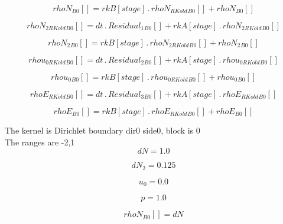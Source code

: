 \documentclass{article}
\begin{document}
\begin{dmath}{rhoN{_{B0}}}[{}] = {rkB}[{stage}] \,.\, {rhoN_{RKold}{_{B0}}}[{}] + {rhoN{_{B0}}}[{}]\end{dmath}

\begin{dmath}{rhoN_{2 RKold}{_{B0}}}[{}] = dt \,.\, {Residual_{1}{_{B0}}}[{}] + {rkA}[{stage}] \,.\, {rhoN_{2 RKold}{_{B0}}}[{}]\end{dmath}

\begin{dmath}{rhoN_{2}{_{B0}}}[{}] = {rkB}[{stage}] \,.\, {rhoN_{2 RKold}{_{B0}}}[{}] + {rhoN_{2}{_{B0}}}[{}]\end{dmath}

\begin{dmath}{rhou_{0 RKold}{_{B0}}}[{}] = dt \,.\, {Residual_{2}{_{B0}}}[{}] + {rkA}[{stage}] \,.\, {rhou_{0 RKold}{_{B0}}}[{}]\end{dmath}

\begin{dmath}{rhou_{0}{_{B0}}}[{}] = {rkB}[{stage}] \,.\, {rhou_{0 RKold}{_{B0}}}[{}] + {rhou_{0}{_{B0}}}[{}]\end{dmath}

\begin{dmath}{rhoE_{RKold}{_{B0}}}[{}] = dt \,.\, {Residual_{3}{_{B0}}}[{}] + {rkA}[{stage}] \,.\, {rhoE_{RKold}{_{B0}}}[{}]\end{dmath}

\begin{dmath}{rhoE{_{B0}}}[{}] = {rkB}[{stage}] \,.\, {rhoE_{RKold}{_{B0}}}[{}] + {rhoE{_{B0}}}[{}]\end{dmath}

\noindent The kernel is Dirichlet boundary dir0 side0, block is 0\\\noindent The ranges are -2,1\\\begin{dmath}dN = 1.0\end{dmath}

\begin{dmath}dN_{2} = 0.125\end{dmath}

\begin{dmath}u_{0} = 0.0\end{dmath}

\begin{dmath}p = 1.0\end{dmath}

\begin{dmath}{rhoN{_{B0}}}[{}] = dN\end{dmath}
\end{document}
